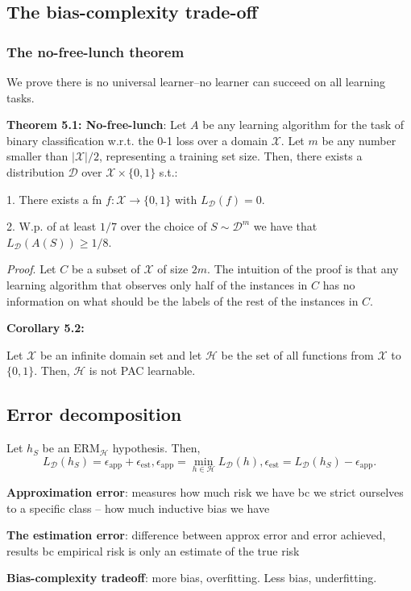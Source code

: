 \newpage

\subsection{The bias-complexity trade-off}

\subsubsection{The no-free-lunch theorem}

We prove there is no universal learner--no learner can succeed on all learning tasks.

\textbf{Theorem 5.1: No-free-lunch}: Let $A$ be any learning algorithm for the task of binary classification w.r.t. the 0-1 loss over a domain $\mathcal{X}$. Let $m$ be any number smaller than $|\mathcal{X}|/2$, representing a training set size. Then, there exists a distribution $\mathcal{D}$ over $\mathcal{X} \times \{0, 1 \}$ s.t.:

1. There exists a fn $f : \mathcal{X} \rightarrow \{0, 1\}$ with $L_{\mathcal{D}}(f) = 0$.

2. W.p. of at least $1/7$ over the choice of $S \sim \mathcal{D}^m$ we have that $L_{\mathcal{D}}(A(S)) \geq 1/8$.

\textit{Proof}. Let $C$ be a subset of $\mathcal{X}$ of size $2m$. The intuition of the proof is that any learning algorithm that observes only half of the instances in $C$ has no information on what should be the labels of the rest of the instances in $C$.

\bigskip

\textbf{Corollary 5.2:}

Let $\mathcal{X}$ be an infinite domain set and let $\mathcal{H}$ be the set of all functions from $\mathcal{X}$ to $\{0, 1\}$. Then, $\mathcal{H}$ is not PAC learnable.

\subsection{Error decomposition}

Let $h_S$ be an $\text{ERM}_{\mathcal{H}}$ hypothesis. Then,
$$L_{\mathcal{D}}(h_S) = \epsilon_{\text{app}} + \epsilon_{\text{est}}, \epsilon_{\text{app}} = \min_{h \in \mathcal{H}} L_{\mathcal{D}} (h), \epsilon_{\text{est}} = L_{\mathcal{D}}(h_S) - \epsilon_{\text{app}}.$$

\textbf{Approximation error}: measures how much risk we have bc we strict ourselves to a specific class -- how much inductive bias we have

\textbf{The estimation error}: difference between approx error and error achieved, results bc empirical risk is only an estimate of the true risk

\bigskip

\textbf{Bias-complexity tradeoff}: more bias, overfitting. Less bias, underfitting.